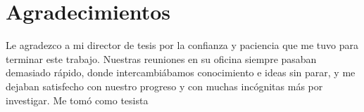 \chapter*{Agradecimientos}

\noindent Le agradezco a mi director de tesis por la confianza y paciencia que me tuvo para terminar este trabajo. Nuestras reuniones en su oficina siempre pasaban demasiado rápido, donde intercambiábamos conocimiento e ideas sin parar, y me dejaban satisfecho con nuestro progreso y con muchas incógnitas más por investigar. Me tomó como tesista 
